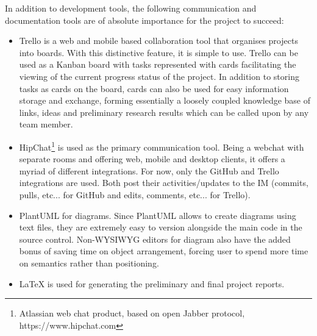 \vspace{1mm}

In addition to development tools, the following communication and documentation tools are of absolute importance for the project to succeed:

\vspace{1mm}

\begin{itemize}
	\item Trello is a web and mobile based collaboration tool that organises projects into boards. With this distinctive feature, it is simple to use. Trello can be used as a Kanban board with tasks represented with cards facilitating the viewing of the current progress status of the project. In addition to storing tasks as cards on the board, cards can also be used for easy information storage and exchange, forming essentially a loosely coupled knowledge base of links, ideas and preliminary research results which can be called upon by any team member.
	\item HipChat\footnote{Atlassian web chat product, based on open Jabber protocol, https://www.hipchat.com} is used as the primary communication tool. Being a webchat with separate rooms and offering web, mobile and desktop clients, it offers a myriad of different integrations. For now, only the GitHub and Trello integrations are used. Both post their activities/updates to the IM (commits, pulls, etc... for GitHub and edits, comments, etc... for Trello).
	\item PlantUML for diagrams. Since PlantUML allows to create diagrams using text files, they are extremely easy to version alongside the main code in the source control. Non-WYSIWYG editors for diagram also have the added bonus of saving time on object arrangement, forcing user to spend more time on semantics rather than positioning.
	\item LaTeX is used for generating the preliminary and final project reports.
\end{itemize}